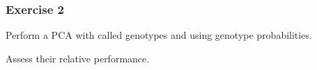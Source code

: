
\begin{frame}
\frametitle{Exercise 2}

	Perform a PCA with called genotypes and using genotype probabilities. 
	
	Assess their relative performance.

\end{frame}







